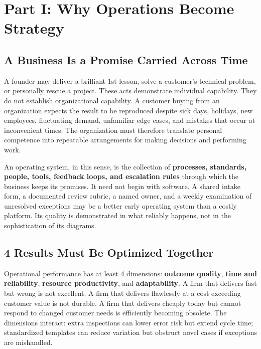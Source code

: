 \section*{Part I: Why Operations Become Strategy}

\subsection{A Business Is a Promise Carried Across Time}
\label{sec:promise_across_time}

A founder may deliver a brilliant 1st lesson, solve a customer's technical problem, or personally rescue a project. These acts demonstrate individual capability. They do not establish organizational capability. A customer buying from an organization expects the result to be reproduced despite sick days, holidays, new employees, fluctuating demand, unfamiliar edge cases, and mistakes that occur at inconvenient times. The organization must therefore translate personal competence into repeatable arrangements for making decisions and performing work.

An operating system, in this sense, is the collection of \textbf{processes, standards, people, tools, feedback loops, and escalation rules} through which the business keeps its promises. It need not begin with software. A shared intake form, a documented review rubric, a named owner, and a weekly examination of unresolved exceptions may be a better early operating system than a costly platform. Its quality is demonstrated in what reliably happens, not in the sophistication of its diagrams.

\subsection{4 Results Must Be Optimized Together}
\label{sec:four_results_optimized}

Operational performance has at least 4 dimensions: \textbf{outcome quality}, \textbf{time and reliability}, \textbf{resource productivity}, and \textbf{adaptability}. A firm that delivers fast but wrong is not excellent. A firm that delivers flawlessly at a cost exceeding customer value is not durable. A firm that delivers cheaply today but cannot respond to changed customer needs is efficiently becoming obsolete. The dimensions interact: extra inspections can lower error risk but extend cycle time; standardized templates can reduce variation but obstruct novel cases if exceptions are mishandled.

